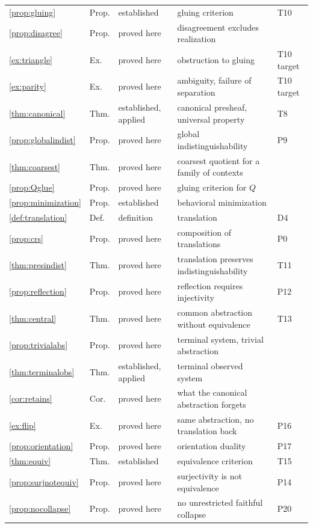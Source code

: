 \begin{center}
\begin{longtable}{lllp{5.3cm}l}
\ref{prop:gluing} & Prop. & established & gluing criterion & T10\\
\ref{prop:disagree} & Prop. & proved here & disagreement excludes realization & \\
\ref{ex:triangle} & Ex. & proved here & obstruction to gluing & T10 target\\
\ref{ex:parity} & Ex. & proved here & ambiguity, failure of separation & T10 target\\
\ref{thm:canonical} & Thm. & established, applied & canonical presheaf, universal property & T8\\
\ref{prop:globalindist} & Prop. & proved here & global indistinguishability & P9\\
\ref{thm:coarsest} & Thm. & proved here & coarsest quotient for a family of contexts & \\
\ref{prop:Qglue} & Prop. & proved here & gluing criterion for $Q$ & \\
\ref{prop:minimization} & Prop. & established & behavioral minimization & \\
\ref{def:translation} & Def. & definition & translation & D4\\
\ref{prop:crs} & Prop. & proved here & composition of translations & P0\\
\ref{thm:presindist} & Thm. & proved here & translation preserves indistinguishability & T11\\
\ref{prop:reflection} & Prop. & proved here & reflection requires injectivity & P12\\
\ref{thm:central} & Thm. & proved here & common abstraction without equivalence & T13\\
\ref{prop:trivialabs} & Prop. & proved here & terminal system, trivial abstraction & \\
\ref{thm:terminalobs} & Thm. & established, applied & terminal observed system & \\
\ref{cor:retains} & Cor. & proved here & what the canonical abstraction forgets & \\
\ref{ex:flip} & Ex. & proved here & same abstraction, no translation back & P16\\
\ref{prop:orientation} & Prop. & proved here & orientation duality & P17\\
\ref{thm:equiv} & Thm. & established & equivalence criterion & T15\\
\ref{prop:surjnotequiv} & Prop. & proved here & surjectivity is not equivalence & P14\\
\ref{prop:nocollapse} & Prop. & proved here & no unrestricted faithful collapse & P20\\

\end{longtable}
\end{center}

